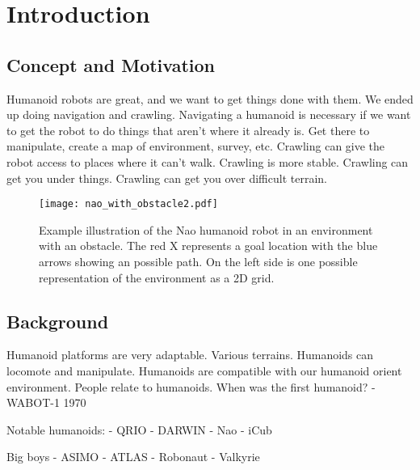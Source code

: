 \chapter{Introduction} \label{ch:introduction}

\section{Concept and Motivation}
Humanoid robots are great, and we want to get things done with them.
We ended up doing navigation and crawling.
Navigating a humanoid is necessary if we want to get the robot to do things
that aren't where it already is.
Get there to manipulate, create a map of environment, survey, etc.
Crawling can give the robot access to places where it can't walk.
Crawling is more stable.
Crawling can get you under things.
Crawling can get you over difficult terrain.

\begin{figure}[h!]
	\centering
    \texttt{[image: nao\_with\_obstacle2.pdf]}
	\caption{Example illustration of the Nao humanoid robot in an environment 
             with an obstacle. The red X represents a goal location with the 
             blue arrows showing an possible path. On the left side is one 
             possible representation of the environment as a 2D grid.}
	\label{fig:nao_with_obstacle2}
\end{figure}

\section{Background}
Humanoid platforms are very adaptable. Various terrains. 
Humanoids can locomote and manipulate.
Humanoids are compatible with our humanoid orient environment.
People relate to humanoids.
When was the first humanoid?
 - WABOT-1 1970
 \cite{Kato73}

 Notable humanoids:
 - QRIO \cite{Ishida2003}
 - DARWIN \cite{Ha2011} 
 - Nao \cite{Gouaillier2009}
 - iCub \cite{Tsagarakis2007iCubTD}

Big boys
- ASIMO \cite{asimo_website}
- ATLAS   \cite{atlas_website}
- Robonaut \cite{robonaut_website}
- Valkyrie \cite{Radford2015}

